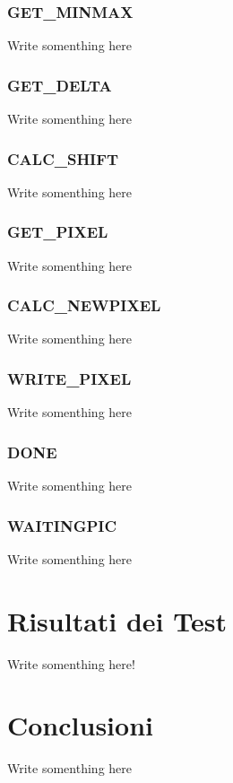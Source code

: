 \documentclass[11pt, a4paper]{article}
\begin{document}
\subsubsection{GET\_MINMAX}
Write somenthing here

\subsubsection{GET\_DELTA}
Write somenthing here

\subsubsection{CALC\_SHIFT}
Write somenthing here

\subsubsection{GET\_PIXEL}
Write somenthing here

\subsubsection{CALC\_NEWPIXEL}
Write somenthing here

\subsubsection{WRITE\_PIXEL}
Write somenthing here

\subsubsection{DONE}
Write somenthing here

\subsubsection{WAITINGPIC}
Write somenthing here

\section{Risultati dei Test}
Write somenthing here!

\section{Conclusioni}
Write somenthing here
\end{document}

